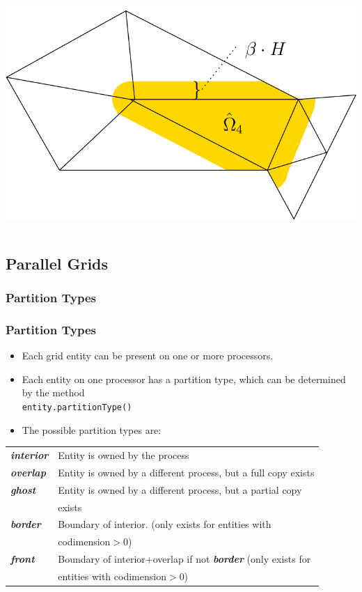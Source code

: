 \begin{frame}
\begin{columns}
\begin{column}{0.4\linewidth}
\begin{onlyenv}
        \vskip5mm
        \includegraphics[width=.36\linewidth]{EPS/konstr_uberl_unstr}
      \end{onlyenv}
    \end{column}
  \end{columns}
\end{frame}

\subsection{Parallel Grids}

\subsubsection{Partition Types}
\begin{frame}[fragile]
\frametitle<presentation>{Partition Types}

\begin{itemize}
\item Each grid entity can be present on one or more processors.
\item Each entity on one processor has a partition type, which can be determined 
by the method\\
        \hspace*{1cm}\lstinline!entity.partitionType()!
\item The possible partition types are:\\
\end{itemize}
\begin{tabular}{ll}
  \em \bfseries interior 
  & Entity is owned by the process\\
  \em \bfseries overlap & Entity is owned by a different process, but a full copy exists\\
  \em \bfseries ghost
  & Entity is owned by a different process, but a partial copy\\
  & exists\\
  \em \bfseries border
  & Boundary of interior. (only exists for entities with \\
  & codimension$>$0)\\
  \em \bfseries front
  & Boundary of interior+overlap if not {\em \bfseries border} (only exists for\\
  & entities with codimension$>$0)
\end{tabular}
\end{frame}


